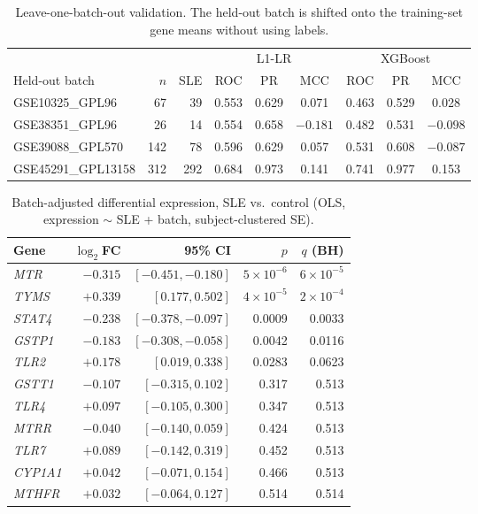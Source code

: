 \documentclass[11pt]{article}
\begin{document}
\begin{table}[h]
\centering
\caption{Leave-one-batch-out validation. The held-out batch is shifted onto the training-set gene means without using labels.}
\label{tab:lobo}
\small
\begin{tabular}{lrrcccccc}
\toprule
 & & & \multicolumn{3}{c}{L1-LR} & \multicolumn{3}{c}{XGBoost} \\
\cmidrule(lr){4-6}\cmidrule(lr){7-9}
Held-out batch & $n$ & SLE & ROC & PR & MCC & ROC & PR & MCC \\
\midrule
GSE10325\_GPL96    & 67  & 39  & 0.553 & 0.629 & 0.071 & 0.463 & 0.529 & 0.028 \\
GSE38351\_GPL96    & 26  & 14  & 0.554 & 0.658 & $-0.181$ & 0.482 & 0.531 & $-0.098$ \\
GSE39088\_GPL570   & 142 & 78  & 0.596 & 0.629 & 0.057 & 0.531 & 0.608 & $-0.087$ \\
GSE45291\_GPL13158 & 312 & 292 & 0.684 & 0.973 & 0.141 & 0.741 & 0.977 & 0.153 \\
\bottomrule
\end{tabular}
\end{table}

\begin{table}[h]
\centering
\caption{Batch-adjusted differential expression, SLE vs.\ control (OLS, expression $\sim$ SLE + batch, subject-clustered SE).}
\label{tab:de}
\small
\begin{tabular}{lrrrr}
\toprule
Gene & $\log_2$FC & 95\% CI & $p$ & $q$ (BH) \\
\midrule
\textit{MTR}    & $-0.315$ & $[-0.451, -0.180]$ & $5\times10^{-6}$ & $6\times10^{-5}$ \\
\textit{TYMS}   & $+0.339$ & $[0.177, 0.502]$   & $4\times10^{-5}$ & $2\times10^{-4}$ \\
\textit{STAT4}  & $-0.238$ & $[-0.378, -0.097]$ & 0.0009 & 0.0033 \\
\textit{GSTP1}  & $-0.183$ & $[-0.308, -0.058]$ & 0.0042 & 0.0116 \\
\textit{TLR2}   & $+0.178$ & $[0.019, 0.338]$   & 0.0283 & 0.0623 \\
\textit{GSTT1}  & $-0.107$ & $[-0.315, 0.102]$  & 0.317 & 0.513 \\
\textit{TLR4}   & $+0.097$ & $[-0.105, 0.300]$  & 0.347 & 0.513 \\
\textit{MTRR}   & $-0.040$ & $[-0.140, 0.059]$  & 0.424 & 0.513 \\
\textit{TLR7}   & $+0.089$ & $[-0.142, 0.319]$  & 0.452 & 0.513 \\
\textit{CYP1A1} & $+0.042$ & $[-0.071, 0.154]$  & 0.466 & 0.513 \\
\textit{MTHFR}  & $+0.032$ & $[-0.064, 0.127]$  & 0.514 & 0.514 \\
\bottomrule
\end{tabular}
\end{table}
\end{document}
